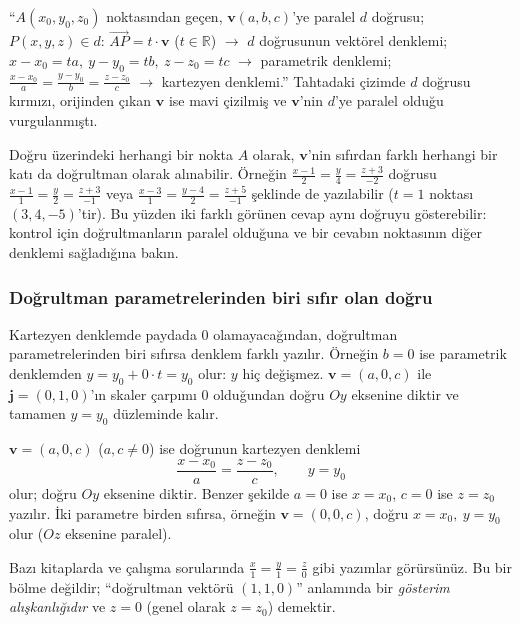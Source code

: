 \begin{tahta}
``$A(x_0,y_0,z_0)$ noktasından geçen, $\mathbf v(a,b,c)$'ye paralel $d$ doğrusu; $P(x,y,z)\in d$:
$\overrightarrow{AP}=t\cdot\mathbf v$ ($t\in\mathbb R$) $\to$ $d$ doğrusunun vektörel denklemi;
$x-x_0=ta,\ y-y_0=tb,\ z-z_0=tc$ $\to$ parametrik denklemi;
$\frac{x-x_0}{a}=\frac{y-y_0}{b}=\frac{z-z_0}{c}$ $\to$ kartezyen denklemi.''
Tahtadaki çizimde $d$ doğrusu kırmızı, orijinden çıkan $\mathbf v$ ise mavi çizilmiş ve $\mathbf v$'nin $d$'ye paralel olduğu vurgulanmıştı.
\end{tahta}

\begin{bilgi}
Doğru üzerindeki herhangi bir nokta $A$ olarak, $\mathbf v$'nin sıfırdan farklı herhangi bir katı da doğrultman olarak alınabilir. Örneğin $\frac{x-1}{2}=\frac{y}{4}=\frac{z+3}{-2}$ doğrusu $\frac{x-1}{1}=\frac{y}{2}=\frac{z+3}{-1}$ veya $\frac{x-3}{1}=\frac{y-4}{2}=\frac{z+5}{-1}$ şeklinde de yazılabilir ($t=1$ noktası $(3,4,-5)$'tir). Bu yüzden iki farklı görünen cevap aynı doğruyu gösterebilir: kontrol için doğrultmanların paralel olduğuna ve bir cevabın noktasının diğer denklemi sağladığına bakın.
\end{bilgi}

\subsubsection{Doğrultman parametrelerinden biri sıfır olan doğru}

Kartezyen denklemde paydada $0$ olamayacağından, doğrultman parametrelerinden biri sıfırsa denklem farklı yazılır. Örneğin $b=0$ ise parametrik denklemden $y=y_0+0\cdot t=y_0$ olur: $y$ hiç değişmez. $\mathbf v=(a,0,c)$ ile $\mathbf j=(0,1,0)$'ın skaler çarpımı $0$ olduğundan doğru $Oy$ eksenine diktir ve tamamen $y=y_0$ düzleminde kalır.

\begin{teorem}
$\mathbf v=(a,0,c)$ ($a,c\neq0$) ise doğrunun kartezyen denklemi
\[ \frac{x-x_0}{a}=\frac{z-z_0}{c},\qquad y=y_0 \]
olur; doğru $Oy$ eksenine diktir. Benzer şekilde $a=0$ ise $x=x_0$, $c=0$ ise $z=z_0$ yazılır. İki parametre birden sıfırsa, örneğin $\mathbf v=(0,0,c)$, doğru $x=x_0,\ y=y_0$ olur ($Oz$ eksenine paralel).
\end{teorem}

\begin{bilgi}
Bazı kitaplarda ve çalışma sorularında $\frac{x}{1}=\frac{y}{1}=\frac{z}{0}$ gibi yazımlar görürsünüz. Bu bir bölme değildir; ``doğrultman vektörü $(1,1,0)$'' anlamında bir \emph{gösterim alışkanlığıdır} ve $z=0$ (genel olarak $z=z_0$) demektir.
\end{bilgi}

